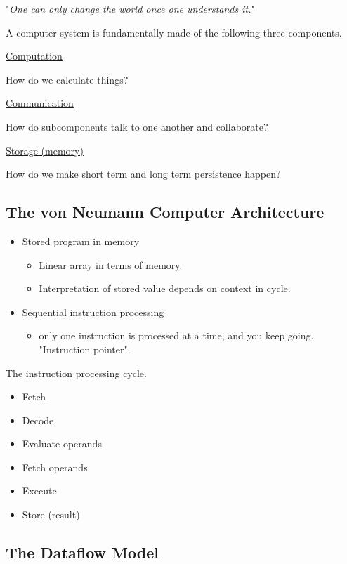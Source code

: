 \documentclass[11pt]{article}
\begin{document}
"\emph{One can only change the world once one understands it.}"

A computer system is fundamentally made of the following three
components.

\uline{Computation}

How do we calculate things?

\uline{Communication}

How do subcomponents talk to one another and collaborate?

\uline{Storage (memory)}

How do we make short term and long term persistence happen?

\subsection{The von Neumann Computer Architecture}
\label{sec:orgheadline3}

\begin{itemize}
\item Stored program in memory
\begin{itemize}
\item Linear array in terms of memory.
\item Interpretation of stored value depends on context in cycle.
\end{itemize}

\item Sequential instruction processing
\begin{itemize}
\item only one instruction is processed at a time, and you keep 
going. "Instruction pointer".
\end{itemize}
\end{itemize}

The instruction processing cycle.
\begin{itemize}
\item Fetch
\item Decode
\item Evaluate operands
\item Fetch operands
\item Execute
\item Store (result)
\end{itemize}

\subsection{The Dataflow Model}
\label{sec:orgheadline5}
\end{document}
